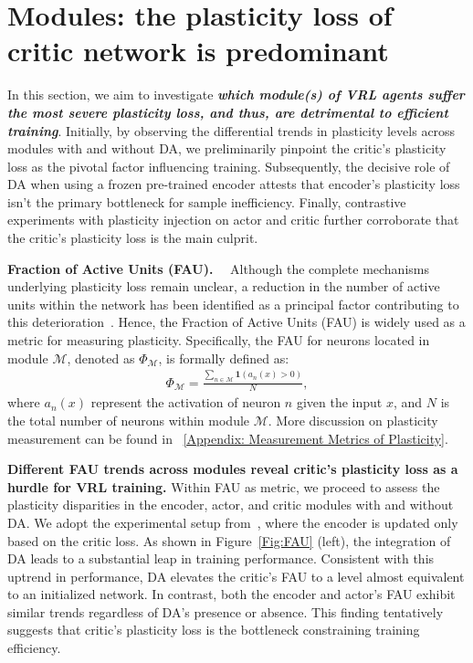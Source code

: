 \section{\textbf{Modules:} the plasticity loss of critic network is predominant}
\label{Sec: Modules}

In this section, we aim to investigate \textbf{\textit{which module(s) of VRL agents suffer the most severe plasticity loss, and thus, are detrimental to efficient training}}.
Initially, by observing the differential trends in plasticity levels across modules with and without DA, we preliminarily pinpoint the critic's plasticity loss as the pivotal factor influencing training.
Subsequently, the decisive role of DA when using a frozen pre-trained encoder attests that encoder's plasticity loss isn't the primary bottleneck for sample inefficiency.
Finally, contrastive experiments with plasticity injection on actor and critic further corroborate that the critic's plasticity loss is the main culprit.

\textbf{Fraction of Active Units (FAU).}~~
Although the complete mechanisms underlying plasticity loss remain unclear, a reduction in the number of active units within the network has been identified as a principal factor contributing to this deterioration~\citep{understanding_plasticity, dormant_neuron, Enhancing_Generalization_Plasticity}.
Hence, the Fraction of Active Units (FAU) is widely used as a metric for measuring plasticity.
Specifically, the FAU for neurons located in module $\mathcal{M}$, denoted as $\Phi_\mathcal{M}$, is formally defined as:
\begin{align}
    \label{eqn:FAU}
    \Phi_\mathcal{M} = \frac{\sum_{n\in \mathcal{M}} \mathbf{1}(a_n(x) > 0)}{N},
\end{align}
where $a_n(x)$ represent the activation of neuron $n$ given the input $x$, and $N$ is the total number of neurons within module $\mathcal{M}$.
More discussion on plasticity measurement can be found in \Appendix~\ref{Appendix: Measurement Metrics of Plasticity}.

\textbf{Different FAU trends across modules reveal critic's plasticity loss as a hurdle for VRL training.} 
Within FAU as metric, we proceed to assess the plasticity disparities in the encoder, actor, and critic modules with and without DA.
We adopt the experimental setup from~\cite{DrQ-v2}, where the encoder is updated only based on the critic loss.
As shown in Figure~\ref{Fig:FAU} \textcolor{mylinkcolor}{(left)}, the integration of DA leads to a substantial leap in training performance.
Consistent with this uptrend in performance, DA elevates the critic's FAU to a level almost equivalent to an initialized network.
In contrast, both the encoder and actor's FAU exhibit similar trends regardless of DA's presence or absence.
This finding tentatively suggests that critic's plasticity loss is the bottleneck constraining training efficiency.


